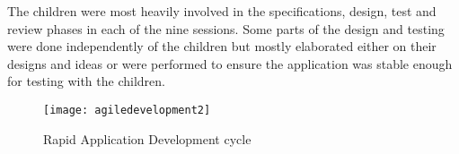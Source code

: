 The children were most heavily involved in the specifications, design, test and review phases in each of the nine sessions. Some parts of the design and testing were done independently of the children but mostly elaborated either on their designs and ideas or were performed to ensure the application was stable enough for testing with the children.  

\begin{figure}
\centering
\texttt{[image: agiledevelopment2]}
\caption{Rapid Application Development cycle }
\label{fig:agiledesignprocess}
\end{figure}